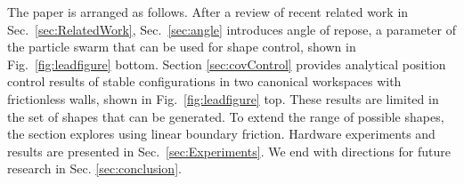 The paper is arranged as follows. 
After a review of recent related work in Sec.~\ref{sec:RelatedWork},
  Sec.~\ref{sec:angle} introduces angle of repose, a parameter of the particle swarm that can be used for shape control, shown in Fig.~\ref{fig:leadfigure} bottom.
Section \ref{sec:covControl} provides analytical position control results of stable configurations in two canonical workspaces with frictionless walls, shown in Fig.~\ref{fig:leadfigure} top. These results are limited in the set of shapes that can be generated.  To extend the range of possible shapes, the section explores using linear boundary friction.
 Hardware experiments and results are presented in Sec.~\ref{sec:Experiments}.
 We end with directions for future research in Sec.  \ref{sec:conclusion}.



